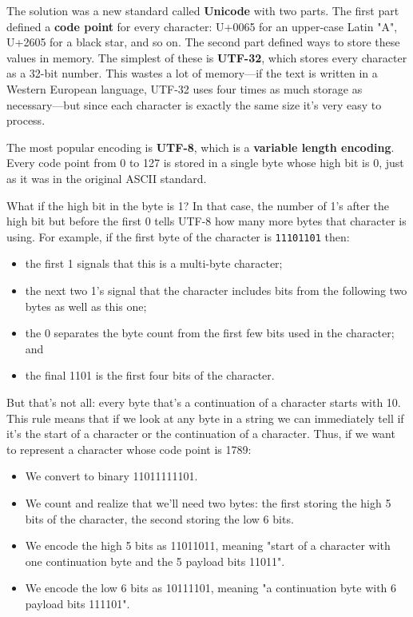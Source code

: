 \documentclass{scrbook}
\newcommand{\glossref}[1]{\textbf{#1}}
\begin{document}
The solution was a new standard called \glossref{Unicode} with two parts.
The first part defined a \glossref{code point} for every character:
U+0065 for an upper-case Latin "A",
U+2605 for a black star,
and so on.
The second part defined ways to store these values in memory.
The simplest of these is \glossref{UTF-32},
which stores every character as a 32-bit number.
This wastes a lot of memory—if the text is written in a Western European language,
UTF-32 uses four times as much storage as necessary—but
since each character is exactly the same size it's very easy to process.


The most popular encoding is \glossref{UTF-8},
which is a \glossref{variable length encoding}.
Every code point from 0 to 127 is stored in a single byte whose high bit is 0,
just as it was in the original ASCII standard.


What if the high bit in the byte is 1?
In that case,
the number of 1's after the high bit but before the first 0
tells UTF-8 how many more bytes that character is using.
For example,
if the first byte of the character is \texttt{11101101} then:

\begin{itemize}

\item the first 1 signals that this is a multi-byte character;

\item the next two 1's signal that the character includes bits
    from the following two bytes as well as this one;

\item the 0 separates the byte count from the first few bits used in the character;
    and

\item the final 1101 is the first four bits of the character.

\end{itemize}


But that's not all:
every byte that's a continuation of a character starts with 10.
This rule means that if we look at any byte in a string
we can immediately tell if it's the start of a character
or the continuation of a character.
Thus,
if we want to represent a character whose code point is 1789:

\begin{itemize}

\item We convert to binary 11011111101.

\item We count and realize that we'll need two bytes:
    the first storing the high 5 bits of the character,
    the second storing the low 6 bits.

\item We encode the high 5 bits as 11011011,
    meaning "start of a character with one continuation byte
    and the 5 payload bits 11011".

\item We encode the low 6 bits as 10111101,
    meaning "a continuation byte with 6 payload bits 111101".

\end{itemize}
\end{document}
